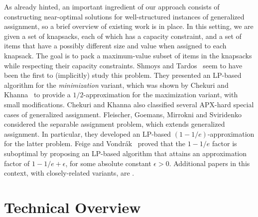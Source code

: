 \documentclass[11pt]{article}
\theoremstyle{plain}
\theoremstyle{definition}
\begin{document}
As already hinted, an important ingredient of our approach consists of constructing near-optimal solutions for well-structured instances of generalized assignment, so a brief overview of existing work is in place. In this setting, we are given a set of knapsacks, each of which has a capacity constraint, and a set of items that have a possibly different size and value when assigned to each knapsack. The goal is to pack a maximum-value subset of items in the knapsacks while respecting their capacity constraints. Shmoys and Tardos~\cite{ShmoysT93} seem to have been the first to (implicitly) study this problem. They presented an LP-based algorithm for the \textit{minimization} variant, which was shown by Chekuri and Khanna~\cite{ChekuriK05} to provide a $1/2$-approximation for the maximization variant, with small modifications. Chekuri and Khanna also classified several APX-hard special cases of generalized assignment. Fleischer, Goemans, Mirrokni and Sviridenko~\cite{FleischerGMS11} considered the separable assignment problem, which extends generalized assignment. In particular, they developed an LP-based $(1-1/e)$-approximation for the latter problem. Feige and Vondr{\'a}k~\cite{FeigeV06} proved that the $1 - 1/e$ factor is suboptimal by proposing an LP-based algorithm that attains an approximation factor of $1 - 1/e + \epsilon$, for some absolute constant $\epsilon > 0$. Additional papers in this context, with closely-related variants, are \cite{CohenKR06,NutovBY06}.



\section{Technical Overview} \label{sec:techniques}
\end{document}
